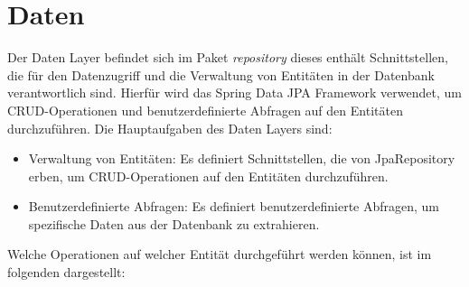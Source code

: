 
\chapter{Daten}
\label{ch:data}

Der Daten Layer befindet sich im Paket \textit{repository} dieses enthält Schnittstellen, die für den Datenzugriff und die Verwaltung von Entitäten in der Datenbank verantwortlich sind. 
Hierfür wird das Spring Data JPA Framework verwendet, um \gls{CRUD}-Operationen und benutzerdefinierte Abfragen auf den Entitäten durchzuführen.  
Die Hauptaufgaben des Daten Layers sind:

\begin{itemize}
    \item Verwaltung von Entitäten: Es definiert Schnittstellen, die von JpaRepository erben, um CRUD-Operationen auf den Entitäten durchzuführen.
    \item Benutzerdefinierte Abfragen: Es definiert benutzerdefinierte Abfragen, um spezifische Daten aus der Datenbank zu extrahieren.
\end{itemize}

Welche Operationen auf welcher Entität durchgeführt werden können, ist im folgenden dargestellt: 

